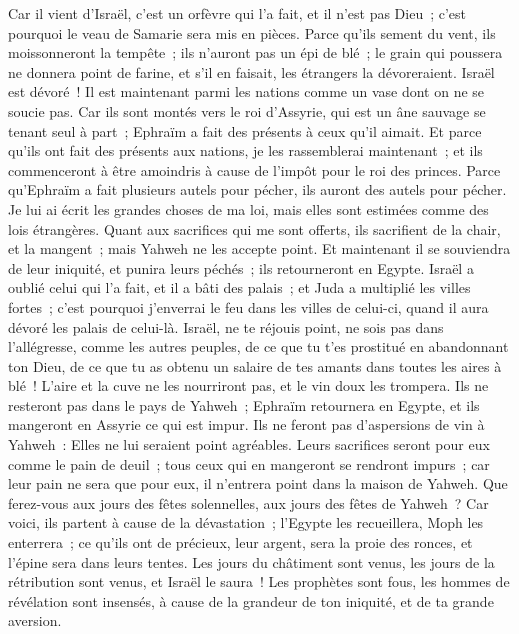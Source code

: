 \begin{multicols}{2}
Car il vient d'Israël, c'est un orfèvre qui l'a fait, et il n'est pas Dieu~; c'est pourquoi le veau de Samarie sera mis en pièces.
Parce qu'ils sement du vent, ils moissonneront la tempête~; ils n'auront pas un épi de blé~; le grain qui poussera ne donnera point de farine, et s'il en faisait, les étrangers la dévoreraient.
Israël est dévoré~! Il est maintenant parmi les nations comme un vase dont on ne se soucie pas.
Car ils sont montés vers le roi d'Assyrie, qui est un âne sauvage se tenant seul à part~; Ephraïm a fait des présents à ceux qu'il aimait.
Et parce qu'ils ont fait des présents aux nations, je les rassemblerai maintenant~; et ils commenceront à être amoindris à cause de l'impôt pour le roi des princes.
Parce qu'Ephraïm a fait plusieurs autels pour pécher, ils auront des autels pour pécher.
Je lui ai écrit les grandes choses de ma loi, mais elles sont estimées comme des lois étrangères.
Quant aux sacrifices qui me sont offerts, ils sacrifient de la chair, et la mangent~; mais Yahweh ne les accepte point. Et maintenant il se souviendra de leur iniquité, et punira leurs péchés~; ils retourneront en Egypte.
Israël a oublié celui qui l'a fait, et il a bâti des palais~; et Juda a multiplié les villes fortes~; c'est pourquoi j'enverrai le feu dans les villes de celui-ci, quand il aura dévoré les palais de celui-là.
\VerseOne{}Israël, ne te réjouis point, ne sois pas dans l'allégresse, comme les autres peuples, de ce que tu t'es prostitué en abandonnant ton Dieu, de ce que tu as obtenu un salaire de tes amants dans toutes les aires à blé~!
L'aire et la cuve ne les nourriront pas, et le vin doux les trompera.
Ils ne resteront pas dans le pays de Yahweh~; Ephraïm retournera en Egypte, et ils mangeront en Assyrie ce qui est impur.
Ils ne feront pas d'aspersions de vin à Yahweh~: Elles ne lui seraient point agréables. Leurs sacrifices seront pour eux comme le pain de deuil~; tous ceux qui en mangeront se rendront impurs~; car leur pain ne sera que pour eux, il n'entrera point dans la maison de Yahweh.
Que ferez-vous aux jours des fêtes solennelles, aux jours des fêtes de Yahweh~?
Car voici, ils partent à cause de la dévastation~; l'Egypte les recueillera, Moph les enterrera~; ce qu'ils ont de précieux, leur argent, sera la proie des ronces, et l'épine sera dans leurs tentes.
Les jours du châtiment sont venus, les jours de la rétribution sont venus, et Israël le saura~! Les prophètes sont fous, les hommes de révélation sont insensés, à cause de la grandeur de ton iniquité, et de ta grande aversion.

\end{multicols}
